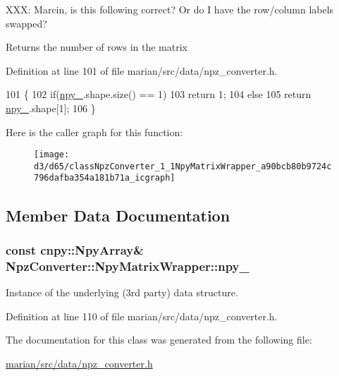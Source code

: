 X\+XX\+: Marcin, is this following correct? Or do I have the row/column labels swapped?

\begin{DoxyReturn}{Returns}
the number of rows in the matrix 
\end{DoxyReturn}


Definition at line 101 of file marian/src/data/npz\+\_\+converter.\+h.


\begin{DoxyCode}
101                          \{
102       \textcolor{keywordflow}{if}(\hyperlink{classNpzConverter_1_1NpyMatrixWrapper_a4a32de31f6410ae49105b9d719de028b}{npy\_}.shape.size() == 1)
103         \textcolor{keywordflow}{return} 1;
104       \textcolor{keywordflow}{else}
105         \textcolor{keywordflow}{return} \hyperlink{classNpzConverter_1_1NpyMatrixWrapper_a4a32de31f6410ae49105b9d719de028b}{npy\_}.shape[1];
106     \}
\end{DoxyCode}


Here is the caller graph for this function\+:
\nopagebreak
\begin{figure}[H]
\begin{center}
\leavevmode
\texttt{[image: d3/d65/classNpzConverter\_1\_1NpyMatrixWrapper\_a90bcb80b9724c796dafba354a181b71a\_icgraph]}
\end{center}
\end{figure}




\subsection{Member Data Documentation}
\subsubsection[{\texorpdfstring{npy\+\_\+}{npy_}}]{\setlength{\rightskip}{0pt plus 5cm}const cnpy\+::\+Npy\+Array\& Npz\+Converter\+::\+Npy\+Matrix\+Wrapper\+::npy\+\_\+\hspace{0.3cm}{\ttfamily [private]}}\hypertarget{classNpzConverter_1_1NpyMatrixWrapper_a4a32de31f6410ae49105b9d719de028b}{}\label{classNpzConverter_1_1NpyMatrixWrapper_a4a32de31f6410ae49105b9d719de028b}
Instance of the underlying (3rd party) data structure. 

Definition at line 110 of file marian/src/data/npz\+\_\+converter.\+h.



The documentation for this class was generated from the following file\+:\begin{DoxyCompactItemize}
\item 
\hyperlink{marian_2src_2data_2npz__converter_8h}{marian/src/data/npz\+\_\+converter.\+h}\end{DoxyCompactItemize}
